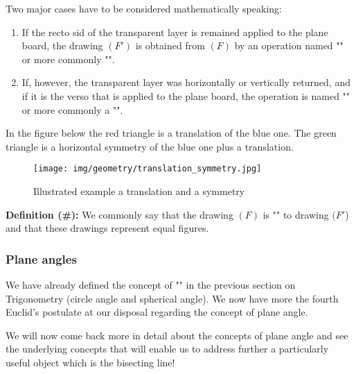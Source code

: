 	Two major cases have to be considered mathematically speaking:
	\begin{enumerate}
		\item If the recto sid of the transparent layer is remained applied to the plane board, the drawing $(F')$ is obtained from $(F)$ by an operation named "" or more commonly "".
		
		\item If, however, the transparent layer was horizontally or vertically returned, and if it is the verso that is applied to the plane board, the operation is named "" or more commonly a "".
	\end{enumerate}
	In the figure below the red triangle is a translation of the blue one. The green triangle is a horizontal symmetry of the blue one plus a translation.
	\begin{figure}[H]
		\centering
		\texttt{[image: img/geometry/translation\_symmetry.jpg]}
		\caption{Illustrated example a translation and a symmetry}
	\end{figure}
	
	\textbf{Definition (\#\mydef):} We commonly say that the drawing $(F)$ is "" to drawing $(F '$) and that these drawings represent equal figures.

	\subsubsection{Plane angles}
	We have already defined the concept of "" in the previous section on Trigonometry (circle angle and spherical angle). We now have more the fourth Euclid's postulate at our disposal regarding the concept of plane angle.
	
	We will now come back more in detail about the concepts of plane angle and see the underlying concepts that will enable us to address further a particularly useful object which is the bisecting line!

